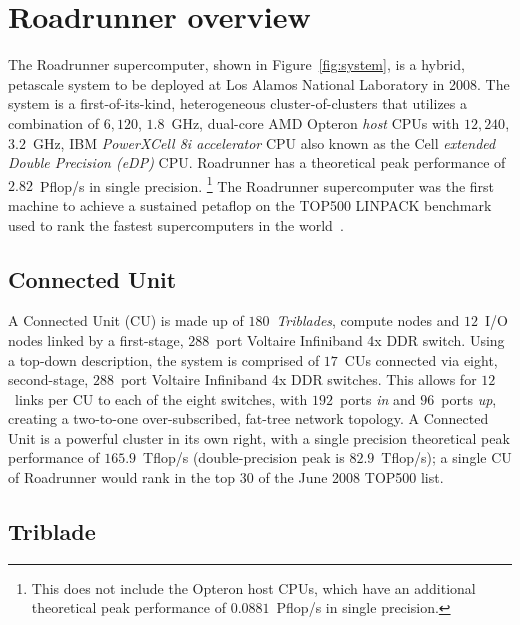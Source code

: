 \documentclass[journal,twoside]{IEEEtran}
\newcommand{\fig}[1]{Figure~\ref{fig:#1}}
\begin{document}
\section{Roadrunner overview}

The Roadrunner supercomputer, shown in \fig{system}, is a hybrid,
petascale system to be deployed at Los Alamos National Laboratory in
2008.  The system is a first-of-its-kind, heterogeneous
cluster-of-clusters that utilizes a combination of $6,120$, $1.8$~GHz,
dual-core AMD Opteron \emph{host} CPUs with $12,240$, $3.2$~GHz, IBM
\emph{PowerXCell 8i accelerator} CPU also known as the Cell
\emph{extended Double Precision (eDP)} CPU.  Roadrunner has a
theoretical peak performance of $2.82$~Pflop/s in single precision.
\footnote{This does not include the Opteron host CPUs, which have
an additional theoretical peak performance of $0.0881$~Pflop/s in
single precision.}  The Roadrunner supercomputer was the first machine
to achieve a sustained petaflop on the TOP500 LINPACK benchmark used
to rank the fastest supercomputers in the world~\cite{top500}.

\subsection{Connected Unit}

A Connected Unit (CU) is made up of $180$~\emph{Triblades}, compute
nodes and $12$~I/O nodes linked by a first-stage, $288$~port Voltaire
Infiniband 4x DDR switch.  Using a top-down description, the system is
comprised of $17$~CUs connected via eight, second-stage, $288$~port
Voltaire Infiniband 4x DDR switches.  This allows for $12$~links per
CU to each of the eight switches, with $192$~ports
\emph{in} and $96$~ports \emph{up}, creating a two-to-one
over-subscribed, fat-tree network topology.  A Connected Unit is a
powerful cluster in its own right, with a single precision theoretical
peak performance of $165.9$~Tflop/s (double-precision peak is
$82.9$~Tflop/s); a single CU of Roadrunner would rank in the top $30$
of the June 2008 TOP500 list.

\subsection{Triblade}
\end{document}
